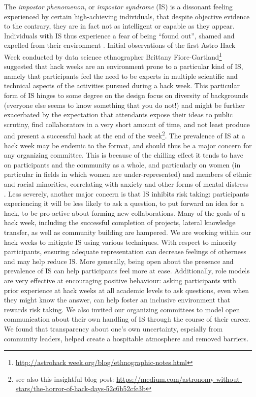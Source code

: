 \documentclass{aastex62}
\begin{document}
The \textit{impostor phenomenon}, or \textit{impostor syndrome} (IS) is a dissonant feeling experienced by certain high-achieving individuals, that despite objective evidence to the contrary, they are in fact not as intelligent or capable as they appear.
Individuals with IS thus experience a fear of being ``found out'', shamed and expelled from their environment \citep{Clance1978-ef}.
Initial observations of the first Astro Hack Week conducted by data science ethnographer Brittany Fiore-Gartland\footnote{\url{http://astrohack week.org/blog/ethnographic-notes.html}} suggested that hack weeks are an environment prone to a particular kind of IS, namely that participants feel the need to be experts in multiple scientific and technical aspects of the activities pursued during a hack week.
This particular form of IS hinges to some degree on the design focus on diversity of backgrounds (everyone else seems to know something that you do not!) and might be further exacerbated by the expectation that attendants expose their ideas to public scrutiny, find collaborators in a very short amount of time, and not least produce and present a successful hack at the end of the week\footnote{see also this insightful blog post: \url{https://medium.com/astronomy-without-stars/the-horror-of-hack-days-52c6b52cfc3b}}.
The prevalence of IS at a hack week may be endemic to the format, and should thus be a major concern for any organizing committee.
This is because of the chilling effect it tends to have on participants and the community as a whole, and particularly on women (in particular in fields in which women are under-represented) and members of ethnic and racial minorities, correlating with anxiety and other forms of mental distress \citep{Parkman2016-ro}.
Less severely, another major concern is that IS inhibits risk taking: participants experiencing it will be less likely to ask a question, to put forward an idea for a hack, to be pro-active about forming new collaborations.
 Many of the goals of a hack week, including the successful completion of projects, lateral knowledge transfer, as well as community building are hampered.
We are working within our hack weeks to mitigate IS using various techniques.
With respect to minority participants, ensuring adequate representation can decrease feelings of otherness and may help reduce IS.
More generally, being open about the presence and prevalence of IS can help participants feel more at ease. %
Additionally, role models are very effective at encouraging positive behaviour: asking participants with prior experience at hack weeks at all academic levels to ask questions, even when they might know the answer, can help foster an inclusive environment that rewards risk taking. We also invited our organizing committees to model open communication about their own handling of IS through the course of their career. We found that transparency about one's own uncertainty, espcially from community leaders, helped create a hospitable atmosphere and removed barriers. 
\end{document}
